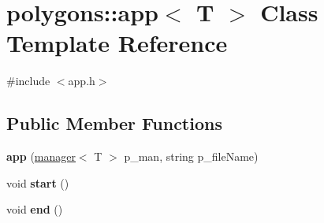 \hypertarget{classpolygons_1_1app}{\section{polygons\-:\-:app$<$ T $>$ Class Template Reference}
\label{classpolygons_1_1app}
}


{\ttfamily \#include $<$app.\-h$>$}

\subsection*{Public Member Functions}
\begin{DoxyCompactItemize}
\item 
\hypertarget{classpolygons_1_1app_a216375eb362cae67f2cafc7af9d3371b}{{\bfseries app} (\hyperlink{classpolygons_1_1manager}{manager}$<$ T $>$ p\-\_\-man, string p\-\_\-file\-Name)}\label{classpolygons_1_1app_a216375eb362cae67f2cafc7af9d3371b}

\item 
\hypertarget{classpolygons_1_1app_ae88f2d95274e77881443122ca42a1cd0}{void {\bfseries start} ()}\label{classpolygons_1_1app_ae88f2d95274e77881443122ca42a1cd0}

\item 
\hypertarget{classpolygons_1_1app_a6d7381dafd5d79a0b8f8a945601521f9}{void {\bfseries end} ()}\label{classpolygons_1_1app_a6d7381dafd5d79a0b8f8a945601521f9}

\end{DoxyCompactItemize}
